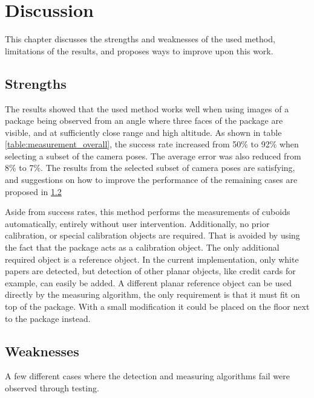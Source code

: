 \chapter{Discussion}
This chapter discusses the strengths and weaknesses of the used method, limitations of the results, and proposes ways to improve upon this work.

\section{Strengths}
The results showed that the used method works well when using images of a package being observed from an angle where three faces of the package are visible, and at sufficiently close range and high altitude. 
As shown in table \ref{table:measurement_overall}, the success rate increased from 50\% to 92\% when selecting a subset of the camera poses.
The average error was also reduced from 8\% to 7\%.
The results from the selected subset of camera poses are satisfying, and suggestions on how to improve the performance of the remaining cases are proposed in \ref{discussion:weaknesses}

Aside from success rates, this method performs the measurements of cuboids automatically, entirely without user intervention.
Additionally, no prior calibration, or special calibration objects are required.
That is avoided by using the fact that the package acts as a calibration object.
The only additional required object is a reference object.
In the current implementation, only white papers are detected, but detection of other planar objects, like credit cards for example, can easily be added.
A different planar reference object can be used directly by the measuring algorithm, the only requirement is that it must fit on top of the package.
With a small modification it could be placed on the floor next to the package instead.





\section{Weaknesses} \label{discussion:weaknesses}
A few different cases where the detection and measuring algorithms fail were observed through testing.

